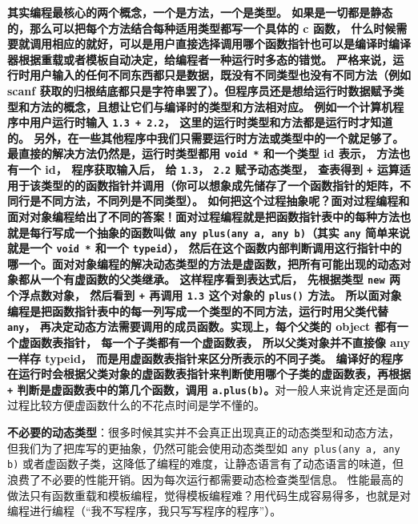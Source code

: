 \textbf{其实编程最核心的两个概念，一个是\textbf{方法}，一个是\textbf{类型}。 如果是一切都是静态的，那么可以把每个方法结合每种适用类型都写一个具体的 c 函数， 什么时候需要就调用相应的就好，可以是用户直接选择调用哪个函数指针也可以是编译时编译器根据重载或者模板自动决定，给编程者一种运行时多态的错觉。 严格来说，运行时用户输入的任何不同东西都只是数据，既没有不同类型也没有不同方法（例如 scanf 获取的归根结底都只是字符串罢了）。但程序员还是想给运行时数据赋予类型和方法的概念，且想让它们与编译时的类型和方法相对应。 例如一个计算机程序中用户运行时输入 \verb`1.3 + 2.2`， 这里的运行时类型和方法都是运行时才知道的。 另外，在一些其他程序中我们只需要运行时方法或类型中的一个就足够了。 最直接的解决方法仍然是，运行时类型都用 \verb`void *` 和一个类型 id 表示， 方法也有一个 id， 程序获取输入后， 给 \verb`1.3`， \verb`2.2` 赋予动态类型， 查表得到 \verb`+` 运算适用于该类型的的函数指针并调用（你可以想象成先储存了一个函数指针的矩阵，不同行是不同方法，不同列是不同类型）。 如何把这个过程抽象呢？面对过程编程和面对对象编程给出了不同的答案！面对过程编程就是把函数指针表中的每种方法也就是每行写成一个抽象的函数叫做 \verb`any plus(any a, any b)`（其实 \verb`any` 简单来说就是一个 \verb`void *` 和一个 \verb`typeid`）， 然后在这个函数内部判断调用这行指针中的哪一个。面对对象编程的解决动态类型的方法是虚函数，把所有可能出现的动态对象都从一个有虚函数的父类继承。 这样程序看到表达式后， 先根据类型 \verb`new` 两个浮点数对象， 然后看到 \verb`+` 再调用 \verb`1.3` 这个对象的 \verb`plus()` 方法。 所以面对象编程是把函数指针表中的每一列写成一个类型的不同方法，运行时用父类代替 \verb`any`， 再决定动态方法需要调用的成员函数。实现上，每个父类的 object 都有一个虚函数表指针， 每一个子类都有一个虚函数表， 所以父类对象并不直接像 any 一样存 typeid， 而是用虚函数表指针来区分所表示的不同子类。 编译好的程序在运行时会根据父类对象的虚函数表指针来判断使用哪个子类的虚函数表，再根据 \verb`+` 判断是虚函数表中的第几个函数，调用 \verb`a.plus(b)`。}对一般人来说肯定还是面向过程比较方便虚函数什么的不花点时间是学不懂的。

\textbf{不必要的动态类型}：很多时候其实并不会真正出现真正的动态类型和动态方法， 但我们为了把库写的更抽象，仍然可能会使用动态类型如 \verb`any plus(any a, any b)` 或者虚函数子类，这降低了编程的难度，让静态语言有了动态语言的味道，但浪费了不必要的性能开销。因为每次运行都需要动态检查类型信息。 性能最高的做法只有函数重载和模板编程，觉得模板编程难？用代码生成容易得多，也就是对编程进行编程（“我不写程序，我只写写程序的程序”）。

